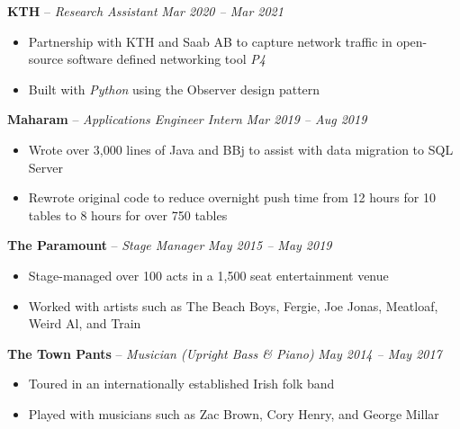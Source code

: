 \documentclass[10pt,letterpaper]{article}
\begin{document}

\headedsection
{\textbf{KTH} -- \textit{Research Assistant}}
{\textit{Mar 2020 -- Mar 2021}} {
	\begin{itemize}[noitemsep,nolistsep]
		\item Partnership with KTH and Saab AB to capture network traffic in open-source software defined networking tool \textit{P4}
		\item Built with \textit{Python} using the Observer design pattern
	\end{itemize}
}
\vspace{-1mm}

\headedsection
{\textbf{Maharam} -- \textit{Applications Engineer Intern}}
{\textit{Mar 2019 -- Aug 2019}} {
	\begin{itemize}[noitemsep,nolistsep]
		\item Wrote over 3,000 lines of Java and BBj to assist with data migration to SQL Server
		\item Rewrote original code to reduce overnight push time from 12 hours for 10 tables to 8 hours for over 750 tables
	\end{itemize}
}
\vspace{-1mm}


\headedsection 
{\textbf{The Paramount} -- \textit{Stage Manager}}
{\textit{May 2015 -- May 2019}} {
	\begin{itemize}[noitemsep,nolistsep]
		\item Stage-managed over 100 acts in a 1,500 seat entertainment venue
		\item Worked with artists such as The Beach Boys, Fergie, Joe Jonas, Meatloaf, Weird Al, and Train
	\end{itemize}
}
\vspace{-1mm}


\headedsection 
{\textbf{The Town Pants} -- \textit{Musician (Upright Bass \& Piano)}}
{\textit{May 2014 -- May 2017}} {
	\begin{itemize}[noitemsep,nolistsep]
		\item Toured in an internationally established Irish folk band
		\item Played with musicians such as Zac Brown, Cory Henry, and George Millar
	\end{itemize}
}
\end{document}
